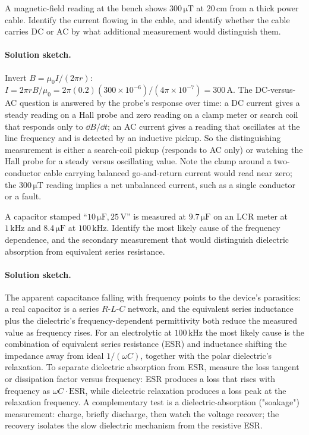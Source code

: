 \begin{exercise}
A magnetic-field reading at the bench shows $300\,\si{\micro\tesla}$
at $20\,\si{\centi\meter}$ from a thick power cable. Identify the
current flowing in the cable, and identify whether the cable carries
DC or AC by what additional measurement would distinguish them.

\paragraph{Solution sketch.} Invert $B = \mu_0 I/(2\pi r)$: $I = 2\pi r
B/\mu_0 = 2\pi(0.2)(300\times 10^{-6})/(4\pi\times 10^{-7}) = 300\,\si{
\ampere}$. The DC-versus-AC question is answered by the probe's
response over time: a DC current gives a steady reading on a Hall probe
and zero reading on a clamp meter or search coil that responds only to
$\dd B/\dd t$; an AC current gives a reading that oscillates at the line
frequency and is detected by an inductive pickup. So the distinguishing
measurement is either a search-coil pickup (responds to AC only) or
watching the Hall probe for a steady versus oscillating value. Note the
clamp around a two-conductor cable carrying balanced go-and-return
current would read near zero; the $300\,\si{\micro\tesla}$ reading
implies a net unbalanced current, such as a single conductor or a fault.
\end{exercise}

\begin{exercise}
A capacitor stamped ``$10\,\si{\micro\farad}, 25\,\si{\volt}$'' is
measured at $9.7\,\si{\micro\farad}$ on an LCR meter at $1\,\si{\kilo
\hertz}$ and $8.4\,\si{\micro\farad}$ at $100\,\si{\kilo\hertz}$.
Identify the most likely cause of the frequency dependence, and the
secondary measurement that would distinguish dielectric absorption
from equivalent series resistance.

\paragraph{Solution sketch.} The apparent capacitance falling with
frequency points to the device's parasitics: a real capacitor is a
series $R$-$L$-$C$ network, and the equivalent series inductance plus
the dielectric's frequency-dependent permittivity both reduce the
measured value as frequency rises. For an electrolytic at $100\,\si{
\kilo\hertz}$ the most likely cause is the combination of equivalent
series resistance (ESR) and inductance shifting the impedance away from
ideal $1/(\omega C)$, together with the polar dielectric's relaxation.
To separate dielectric absorption from ESR, measure the loss tangent or
dissipation factor versus frequency: ESR produces a loss that rises with
frequency as $\omega C \cdot \text{ESR}$, while dielectric relaxation
produces a loss peak at the relaxation frequency. A complementary test
is a dielectric-absorption ("soakage") measurement: charge, briefly
discharge, then watch the voltage recover; the recovery isolates the
slow dielectric mechanism from the resistive ESR.
\end{exercise}


